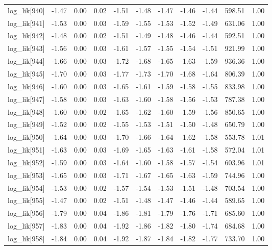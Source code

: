 \begin{table}[ht]
\begin{tabular}{rrrrrrrrrrr}
  log\_lik[940] & -1.47 & 0.00 & 0.02 & -1.51 & -1.48 & -1.47 & -1.46 & -1.44 & 598.51 & 1.00 \\ 
  log\_lik[941] & -1.53 & 0.00 & 0.03 & -1.59 & -1.55 & -1.53 & -1.52 & -1.49 & 631.06 & 1.00 \\ 
  log\_lik[942] & -1.48 & 0.00 & 0.02 & -1.51 & -1.49 & -1.48 & -1.46 & -1.44 & 592.51 & 1.00 \\ 
  log\_lik[943] & -1.56 & 0.00 & 0.03 & -1.61 & -1.57 & -1.55 & -1.54 & -1.51 & 921.99 & 1.00 \\ 
  log\_lik[944] & -1.66 & 0.00 & 0.03 & -1.72 & -1.68 & -1.65 & -1.63 & -1.59 & 936.36 & 1.00 \\ 
  log\_lik[945] & -1.70 & 0.00 & 0.03 & -1.77 & -1.73 & -1.70 & -1.68 & -1.64 & 806.39 & 1.00 \\ 
  log\_lik[946] & -1.60 & 0.00 & 0.03 & -1.65 & -1.61 & -1.59 & -1.58 & -1.55 & 833.98 & 1.00 \\ 
  log\_lik[947] & -1.58 & 0.00 & 0.03 & -1.63 & -1.60 & -1.58 & -1.56 & -1.53 & 787.38 & 1.00 \\ 
  log\_lik[948] & -1.60 & 0.00 & 0.02 & -1.65 & -1.62 & -1.60 & -1.59 & -1.56 & 850.65 & 1.00 \\ 
  log\_lik[949] & -1.52 & 0.00 & 0.02 & -1.55 & -1.53 & -1.51 & -1.50 & -1.48 & 650.79 & 1.00 \\ 
  log\_lik[950] & -1.64 & 0.00 & 0.03 & -1.70 & -1.66 & -1.64 & -1.62 & -1.58 & 553.78 & 1.01 \\ 
  log\_lik[951] & -1.63 & 0.00 & 0.03 & -1.69 & -1.65 & -1.63 & -1.61 & -1.58 & 572.04 & 1.01 \\ 
  log\_lik[952] & -1.59 & 0.00 & 0.03 & -1.64 & -1.60 & -1.58 & -1.57 & -1.54 & 603.96 & 1.01 \\ 
  log\_lik[953] & -1.65 & 0.00 & 0.03 & -1.71 & -1.67 & -1.65 & -1.63 & -1.59 & 744.96 & 1.00 \\ 
  log\_lik[954] & -1.53 & 0.00 & 0.02 & -1.57 & -1.54 & -1.53 & -1.51 & -1.48 & 703.54 & 1.00 \\ 
  log\_lik[955] & -1.47 & 0.00 & 0.02 & -1.51 & -1.48 & -1.47 & -1.46 & -1.44 & 589.65 & 1.00 \\ 
  log\_lik[956] & -1.79 & 0.00 & 0.04 & -1.86 & -1.81 & -1.79 & -1.76 & -1.71 & 685.60 & 1.00 \\ 
  log\_lik[957] & -1.83 & 0.00 & 0.04 & -1.92 & -1.86 & -1.82 & -1.80 & -1.74 & 684.68 & 1.00 \\ 
  log\_lik[958] & -1.84 & 0.00 & 0.04 & -1.92 & -1.87 & -1.84 & -1.82 & -1.77 & 733.70 & 1.00 \\ 

\end{tabular}
\end{table}
